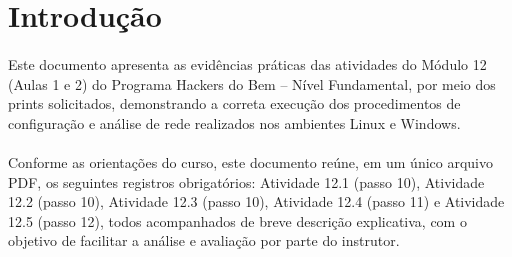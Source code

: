 \section{Introdução}

\paragraph{}
Este documento apresenta as evidências práticas das atividades do Módulo 12
(Aulas 1 e 2) do Programa Hackers do Bem -- Nível Fundamental, por meio dos
prints solicitados, demonstrando a correta execução dos procedimentos de
configuração e análise de rede realizados nos ambientes Linux e Windows.

\paragraph{}
Conforme as orientações do curso, este documento reúne, em um único arquivo
PDF, os seguintes registros obrigatórios: Atividade 12.1 (passo 10), Atividade
12.2 (passo 10), Atividade 12.3 (passo 10), Atividade 12.4 (passo 11) e
Atividade 12.5 (passo 12), todos acompanhados de breve descrição explicativa,
com o objetivo de facilitar a análise e avaliação por parte do instrutor.
